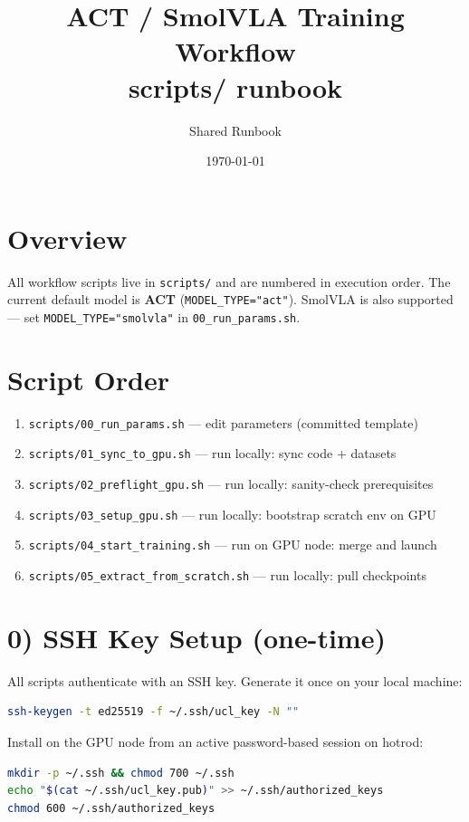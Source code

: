 \documentclass[11pt, a4paper]{article}
\title{ACT / SmolVLA Training Workflow\\{\large scripts/ runbook}}
\author{Shared Runbook}
\date{\today}
\begin{document}
\maketitle

\section*{Overview}
All workflow scripts live in \texttt{scripts/} and are numbered in execution
order. The current default model is \textbf{ACT} (\texttt{MODEL\_TYPE="act"}).
SmolVLA is also supported --- set \texttt{MODEL\_TYPE="smolvla"} in
\texttt{00\_run\_params.sh}.

\section{Script Order}
\begin{enumerate}
    \item \texttt{scripts/00\_run\_params.sh} --- edit parameters (committed template)
    \item \texttt{scripts/01\_sync\_to\_gpu.sh} --- run locally: sync code + datasets
    \item \texttt{scripts/02\_preflight\_gpu.sh} --- run locally: sanity-check prerequisites
    \item \texttt{scripts/03\_setup\_gpu.sh} --- run locally: bootstrap scratch env on GPU
    \item \texttt{scripts/04\_start\_training.sh} --- run on GPU node: merge and launch
    \item \texttt{scripts/05\_extract\_from\_scratch.sh} --- run locally: pull checkpoints
\end{enumerate}

\section{0) SSH Key Setup (one-time)}

All scripts authenticate with an SSH key. Generate it once on your local machine:
\begin{lstlisting}[language=bash]
ssh-keygen -t ed25519 -f ~/.ssh/ucl_key -N ""
\end{lstlisting}

Install on the GPU node from an active password-based session on hotrod:
\begin{lstlisting}[language=bash]
mkdir -p ~/.ssh && chmod 700 ~/.ssh
echo "$(cat ~/.ssh/ucl_key.pub)" >> ~/.ssh/authorized_keys
chmod 600 ~/.ssh/authorized_keys
\end{lstlisting}
\end{document}
